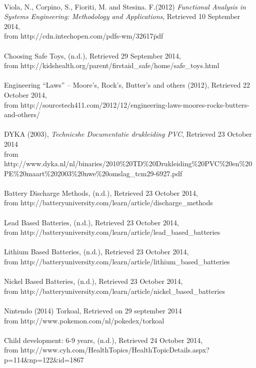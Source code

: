 \documentclass[11pt,twoside,a4paper]{report}
\begin{document}
\\
Viola, N., Corpino, S., Fioriti, M. and Stesina. F.(2012) \textit{Functional Analysis in Systems Engineering: Methodology and Applications}, Retrieved 10 September 2014, \\from http://cdn.intechopen.com/pdfs-wm/32617\.pdf \\
\\
Choosing Safe Toys, (n.d.), Retrieved 29 September 2014, \\from http://kidshealth.org/parent/firstaid\_safe/home/safe\_toys.html \\
\\
Engineering “Laws” – Moore’s, Rock’s, Butter’s and others (2012), Retrieved 22 October 2014, \\from http://sourcetech411.com/2012/12/engineering-laws-moores-rocks-butters-and-others/ \\
\\
DYKA (2003), \textit{Technicshe Documentatie drukleiding PVC}, Retrieved 23 October 2014 \\
from http://www.dyka.nl/nl/binaries/2010\%20TD\%20Drukleiding\%20PVC\%20en\%20PE\%20maart\%202003\%20nwe\%20omslag\_tcm29-6927.pdf \\
\\
Battery Discharge Methods, (n.d.), Retrieved 23 October 2014, \\from http://batteryuniversity.com/learn/article/discharge\_methods\\
\\
Lead Based Batteries, (n.d.), Retrieved 23 October 2014, \\from http://batteryuniversity.com/learn/article/lead\_based\_batteries \\
\\
Lithium Based Batteries, (n.d.), Retrieved 23 October 2014, \\from http://batteryuniversity.com/learn/article/lithium\_based\_batteries \\
\\
Nickel Based Batteries, (n.d.), Retrieved 23 October 2014, \\from 
http://batteryuniversity.com/learn/article/nickel\_based\_batteries \\
\\
Nintendo (2014) Torkoal, Retrieved on 29 september 2014\\ from http://www.pokemon.com/nl/pokedex/torkoal \\
\\
Child development: 6-9 years, (n.d.), Retrieved 24 October 2014, \\from http://www.cyh.com/HealthTopics/HealthTopicDetails.aspx?p=114\&np=122\&id=1867\\
\end{document}
